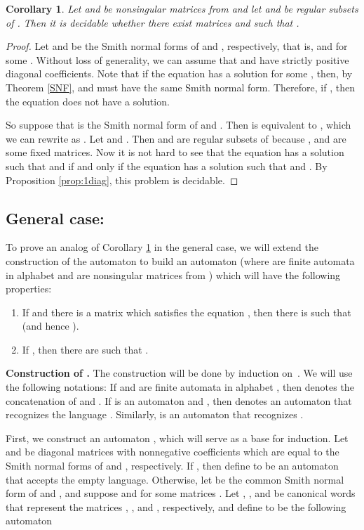 \documentclass[fontsize=11pt,DIV=13,paper=letter]{scrartcl}
\newtheorem{corollary}[theorem]{Corollary}
\theoremstyle{definition}
\begin{document}
\begin{corollary}\label{cor:1diag}
Let  and  be nonsingular matrices from  and let  and  be regular subsets of . Then it is decidable whether there exist matrices  and  such that .
\end{corollary}

\begin{proof}
Let  and  be the Smith normal forms of  and , respectively, that is,  and  for some . Without loss of generality, we can assume that  and  have strictly positive diagonal coefficients. Note that if the equation  has a solution for some , then, by Theorem \ref{SNF},  and  must have the same Smith normal form. Therefore, if , then the equation does not have a solution.

So suppose that  is the Smith normal form of  and . Then  is equivalent to , which we can rewrite as . Let  and . Then  and  are regular subsets of  because , and  are some fixed matrices. Now it is not hard to see that the equation  has a solution  such that  and  if and only if the equation  has a solution  such that  and . By Proposition \ref{prop:1diag}, this problem is decidable.
\end{proof}

\subsection{General case: }\label{Gen}

To prove an analog of Corollary \ref{cor:1diag} in the general case, we will extend the construction of the automaton  to  build an automaton  (where  are finite automata in alphabet  and  are nonsingular matrices from ) which will have the following properties:
\begin{enumerate}[(1)]
\item If  and there is a matrix  which satisfies the equation , then there is  such that  (and hence ).

\item If , then there are  such that .
\end{enumerate}

{\bf Construction of .}
The construction will be done by induction on~. We will use the following notations: If  and  are finite automata in alphabet , then  denotes the concatenation of  and . If  is an automaton and , then  denotes an automaton that recognizes the language . Similarly,  is an automaton that recognizes .

First, we construct an automaton , which will serve as a base for induction. Let  and  be  diagonal matrices with nonnegative coefficients which are equal to the Smith normal forms of  and , respectively. If , then define  to be an automaton that accepts the empty language. Otherwise, let  be the common Smith normal form of  and , and suppose  and  for some matrices . Let , ,  and  be canonical words that represent the matrices , ,  and , respectively, and define  to be the following automaton
\end{document}
